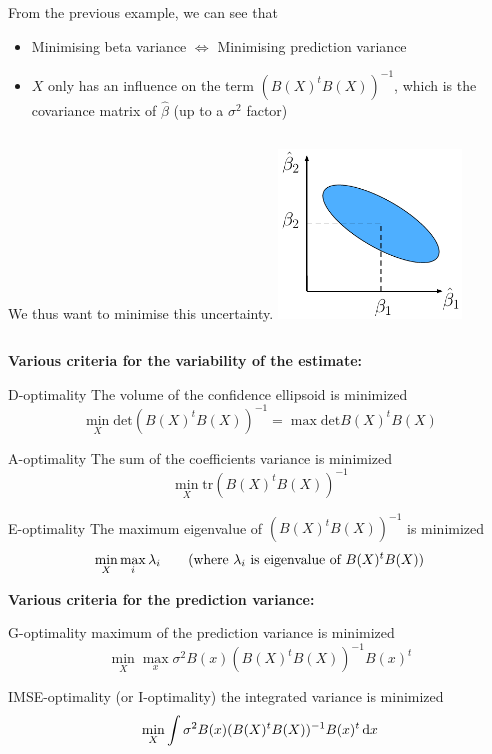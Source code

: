 \begin{frame}{}
From the previous example, we can see that
\begin{itemize}
	\item Minimising beta variance $\Leftrightarrow$ Minimising prediction variance
	\item $X$ only has an influence on the term $(B(X)^t B(X))^{-1}$, which is the covariance matrix of $\hat{\beta}$ (up to a $\sigma^2$ factor)
\end{itemize}
\vspace{5mm}
\begin{columns}[c]
\column{3cm}
We thus want to minimise this uncertainty.
\column{5cm}
\includegraphics[height=4.5cm]{2_Design_of_experiments/figures/latexdraw/optimalDoEreg}
\end{columns}
\end{frame}

\begin{frame}{}
\textbf{Various criteria for the variability of the estimate:}
\begin{block}{D-optimality}
	The volume of the confidence ellipsoid is minimized
	$$ \min_X \mathrm{det} (B(X)^t B(X))^{-1} = \max \mathrm{det} B(X)^t B(X)$$
\end{block}
\begin{block}{A-optimality}
	The sum of the coefficients variance is minimized
	$$ \min_X \mathrm{tr} (B(X)^t B(X))^{-1} $$
\end{block}
\begin{block}{E-optimality}
	The maximum eigenvalue of $(B(X)^t B(X))^{-1}$ is minimized
	$$ \min_X \max_i \lambda_i \text{\qquad (where $\lambda_i$ is eigenvalue of $B(X)^t B(X))$}$$
\end{block}
\end{frame}

\begin{frame}{}
\textbf{Various criteria for the prediction variance:}
\begin{block}{G-optimality}
	maximum of the prediction variance is minimized
	$$ \min_X \max_x \sigma^2 B(x) (B(X)^t B(X))^{-1} B(x)^t$$
\end{block}
\begin{block}{IMSE-optimality (or I-optimality)}
	the integrated variance is minimized
	$$ \min_X \int \sigma^2 B(x) (B(X)^t B(X))^{-1} B(x)^t \, \mathrm{d} x$$
\end{block}
\end{frame}

